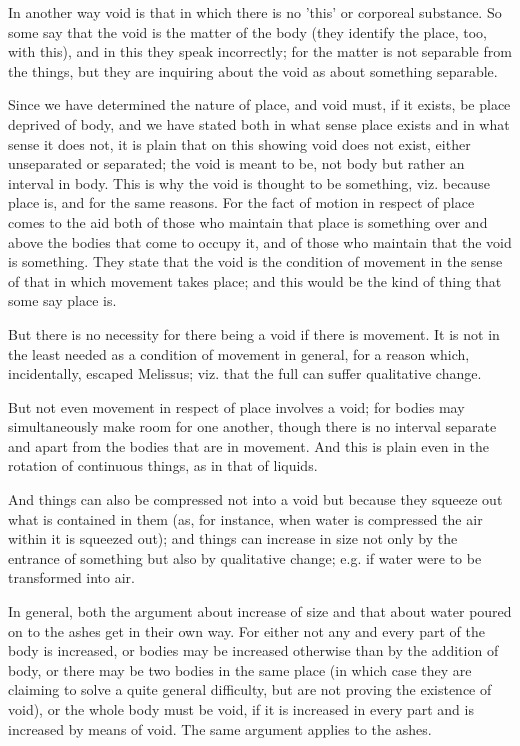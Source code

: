 In another way void is that in which there is no 'this' or corporeal
substance. So some say that the void is the matter of the body (they
identify the place, too, with this), and in this they speak incorrectly;
for the matter is not separable from the things, but they are inquiring
about the void as about something separable. 

Since we have determined the nature of place, and void must, if it
exists, be place deprived of body, and we have stated both in what
sense place exists and in what sense it does not, it is plain that
on this showing void does not exist, either unseparated or separated;
the void is meant to be, not body but rather an interval in body.
This is why the void is thought to be something, viz. because place
is, and for the same reasons. For the fact of motion in respect of
place comes to the aid both of those who maintain that place is something
over and above the bodies that come to occupy it, and of those who
maintain that the void is something. They state that the void is the
condition of movement in the sense of that in which movement takes
place; and this would be the kind of thing that some say place is.

But there is no necessity for there being a void if there is movement.
It is not in the least needed as a condition of movement in general,
for a reason which, incidentally, escaped Melissus; viz. that the
full can suffer qualitative change. 

But not even movement in respect of place involves a void; for bodies
may simultaneously make room for one another, though there is no interval
separate and apart from the bodies that are in movement. And this
is plain even in the rotation of continuous things, as in that of
liquids. 

And things can also be compressed not into a void but because they
squeeze out what is contained in them (as, for instance, when water
is compressed the air within it is squeezed out); and things can increase
in size not only by the entrance of something but also by qualitative
change; e.g. if water were to be transformed into air. 

In general, both the argument about increase of size and that about
water poured on to the ashes get in their own way. For either not
any and every part of the body is increased, or bodies may be increased
otherwise than by the addition of body, or there may be two bodies
in the same place (in which case they are claiming to solve a quite
general difficulty, but are not proving the existence of void), or
the whole body must be void, if it is increased in every part and
is increased by means of void. The same argument applies to the ashes.

